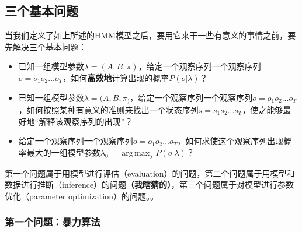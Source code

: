\documentclass[11pt,a4paper]{article}
\DeclareMathOperator*{\argmax}{arg\,max}
\begin{document}
\subsection{三个基本问题}

当我们定义了如上所述的HMM模型之后，要用它来干一些有意义的事情之前，要先解决三个基本问题：
\begin{itemize}
\item 已知一组模型参数$\lambda = (A, B, \pi)$，给定一个观察序列一个观察序列$o=o_1 o_2 ... o_T$，如何\textbf{高效地}计算出现的概率$P(o | \lambda)$？
\item 已知一组模型参数$\lambda = (A, B, \pi_)$，给定一个观察序列一个观察序列$o=o_1 o_2 ... o_T$，如何按照某种有意义的准则来找出一个状态序列$s = s_1 s_2 ... s_T$，使之能够最好地“解释该观察序列的出现”？
\item 给定一个观察序列一个观察序列$o=o_1 o_2 ... o_T$，如何求使这个观察序列出现概率最大的一组模型参数$\lambda_0 = \argmax_{\lambda} P(o | \lambda) $？
\end{itemize}
第一个问题属于用模型进行评估（evaluation）的问题，第二个问题属于用模型和数据进行推断（inference）的问题\textbf{（我瞎猜的）}，第三个问题属于对模型进行参数优化（parameter optimization）的问题。。

\subsubsection{第一个问题：暴力算法}
\end{document}
